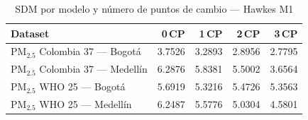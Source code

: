 \begin{table}[htbp]
\centering
\caption{SDM por modelo y n\'{u}mero de puntos de cambio --- Hawkes M1}
\label{tab:hawkes_sdm}
\begin{tabular}{lrrrr}
\toprule
Dataset & 0\,CP & 1\,CP & 2\,CP & 3\,CP \\
\midrule
PM$_{2.5}$ Colombia 37 --- Bogot\'{a} & 3.7526 & 3.2893 & 2.8956 & 2.7795 \\
PM$_{2.5}$ Colombia 37 --- Medell\'{i}n & 6.2876 & 5.8381 & 5.5002 & 3.6564 \\
PM$_{2.5}$ WHO 25 --- Bogot\'{a} & 5.6919 & 5.3216 & 5.4726 & 5.3563 \\
PM$_{2.5}$ WHO 25 --- Medell\'{i}n & 6.2487 & 5.5776 & 5.0304 & 4.5801 \\
\bottomrule
\end{tabular}
\end{table}
